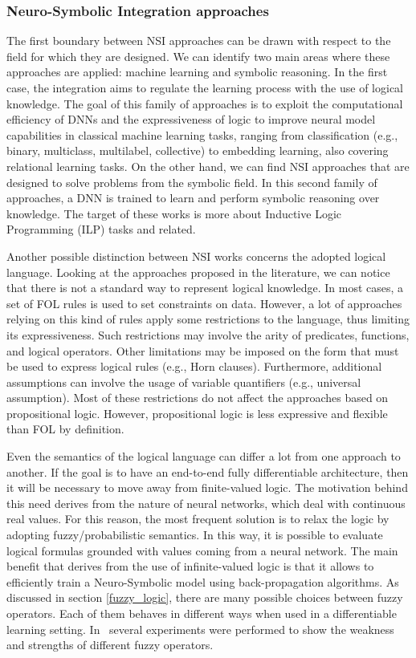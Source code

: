 \subsubsection{Neuro-Symbolic Integration approaches} \label{nsi_approaches}
The first boundary between NSI approaches can be drawn with respect to the field for which they are designed. We can identify two main areas where these approaches are applied: machine learning and symbolic reasoning. In the first case, the integration aims to regulate the learning process with the use of logical knowledge. The goal of this family of approaches is to exploit the computational efficiency of DNNs and the expressiveness of logic to improve neural model capabilities in classical machine learning tasks, ranging from classification (e.g., binary, multiclass, multilabel, collective) to embedding learning, also covering relational learning tasks. On the other hand, we can find NSI approaches that are designed to solve problems from the symbolic field. In this second family of approaches, a DNN is trained to learn and perform symbolic reasoning over knowledge. The target of these works is more about Inductive Logic Programming (ILP) tasks and related.

Another possible distinction between NSI works concerns the adopted logical language. Looking at the approaches proposed in the literature, we can notice that there is not a standard way to represent logical knowledge. In most cases, a set of FOL rules is used to set constraints on data. However, a lot of approaches relying on this kind of rules apply some restrictions to the language, thus limiting its expressiveness. Such restrictions may involve the arity of predicates, functions, and logical operators. Other limitations may be imposed on the form that must be used to express logical rules (e.g., Horn clauses). Furthermore, additional assumptions can involve the usage of variable quantifiers (e.g., universal assumption). Most of these restrictions do not affect the approaches based on propositional logic. However, propositional logic is less expressive and flexible than FOL by definition.

Even the semantics of the logical language can differ a lot from one approach to another. If the goal is to have an end-to-end fully differentiable architecture, then it will be necessary to move away from finite-valued logic. The motivation behind this need derives from the nature of neural networks, which deal with continuous real values. For this reason, the most frequent solution is to relax the logic by adopting fuzzy/probabilistic semantics. In this way, it is possible to evaluate logical formulas grounded with values coming from a neural network. The main benefit that derives from the use of infinite-valued logic is that it allows to efficiently train a Neuro-Symbolic model using back-propagation algorithms. As discussed in section \ref{fuzzy_logic}, there are many possible choices between fuzzy operators. Each of them behaves in different ways when used in a differentiable learning setting. In~\cite{analyzingDiffFuzzyLogic} several experiments were performed to show the weakness and strengths of different fuzzy operators.


